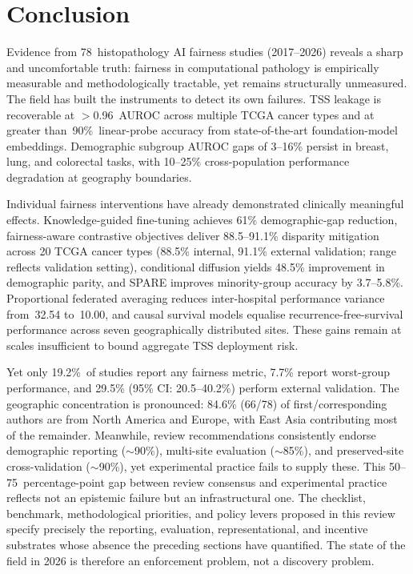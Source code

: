 
\section{Conclusion}
\label{sec:conclusion}

Evidence from 78~histopathology AI fairness studies (2017--2026) reveals a sharp and uncomfortable truth: fairness in computational pathology is empirically measurable and methodologically tractable, yet remains structurally unmeasured. The field has built the instruments to detect its own failures. TSS leakage is recoverable at $>$0.96~AUROC across multiple TCGA cancer types and at greater than~90\%~linear-probe accuracy from state-of-the-art foundation-model embeddings. Demographic subgroup AUROC gaps of 3--16\% persist in breast, lung, and colorectal tasks, with 10--25\% cross-population performance degradation at geography boundaries.

Individual fairness interventions have already demonstrated clinically meaningful effects. Knowledge-guided fine-tuning achieves 61\% demographic-gap reduction, fairness-aware contrastive objectives deliver 88.5--91.1\% disparity mitigation across 20 TCGA cancer types (88.5\% internal, 91.1\% external validation; range reflects validation setting), conditional diffusion yields 48.5\% improvement in demographic parity, and SPARE improves minority-group accuracy by 3.7--5.8\%. Proportional federated averaging reduces inter-hospital performance variance from~32.54 to~10.00, and causal survival models equalise recurrence-free-survival performance across seven geographically distributed sites. These gains remain at scales insufficient to bound aggregate TSS deployment risk.

Yet only 19.2\%~of studies report any fairness metric, 7.7\% report worst-group performance, and 29.5\% (95\% CI: 20.5--40.2\%) perform external validation. The geographic concentration is pronounced: 84.6\% (66/78) of first/corresponding authors are from North America and Europe, with East Asia contributing most of the remainder. Meanwhile, review recommendations consistently endorse demographic reporting ($\sim$90\%), multi-site evaluation ($\sim$85\%), and preserved-site cross-validation ($\sim$90\%), yet experimental practice fails to supply these. This 50--75~percentage-point gap between review consensus and experimental practice reflects not an epistemic failure but an infrastructural one. The checklist, benchmark, methodological priorities, and policy levers proposed in this review specify precisely the reporting, evaluation, representational, and incentive substrates whose absence the preceding sections have quantified. The state of the field in 2026 is therefore an enforcement problem, not a discovery problem.

